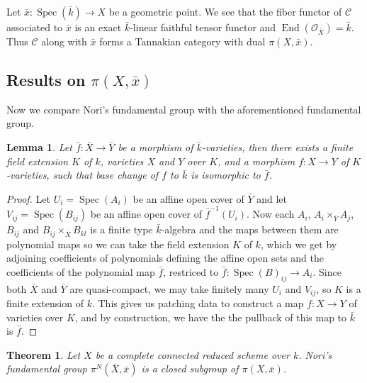 \documentclass{article}
\newcommand{\spec}[1]{\operatorname{Spec}(#1)}
\newcommand{\cat}{\mathcal C} %
\newtheorem{theorem}{Theorem}
\newtheorem{lemma}{Lemma}
\begin{document}
Let $\bar x: \spec {\bar k} \rightarrow X$ be a geometric point. We see that the fiber functor of $\cat$ associated to 
$\bar x$ is an exact $\bar k$-linear faithful tensor functor and $\operatorname{End}(\mathcal O_{\bar X}) = \bar k$. 
Thus $\cat$ along with $\bar x$ forms a Tannakian category with dual $\pi(X,\bar x)$. 

\subsection{Results on $\pi(X,\bar x)$}

Now we compare Nori's fundamental group with the aforementioned fundamental group.
\begin{lemma}
  Let $\bar f:\bar X\rightarrow \bar Y$ be a morphism of $\bar k$-varieties, then there exists a 
  finite field extension $K$ of $k$, varieties $X$ and $Y$ over $K$, and a morphism $f:X \rightarrow Y$ of 
  $K$-varieties, such that base change of $f$ to $\bar k$ is isomorphic to $\bar f$.
\end{lemma}
\begin{proof}
  Let $U_i = \spec {A_i}$ be an affine open cover of $\bar Y$ and let $V_{ij} = \spec {B_{ij}}$ be an affine open cover
  of $\bar f ^{-1} (U_i)$. Now each $A_i$, $A_i \times _{\bar Y} A_j$, $B_{ij}$ and $B_{ij} \times _{\bar X} B_{kl}$ 
  is a finite type $\bar k$-algebra and the maps between them are polynomial maps so we can take the field extension 
  $K$ of $k$, which we get by adjoining coefficients of polynomials defining the affine open sets and the coefficients
  of the polynomial map $\bar f$, restriced to $\bar f : \spec B_{ij} \rightarrow {A_i}$. Since both $\bar X$ and 
  $\bar Y$ are quasi-compact, we may take finitely many $U_i$ and $V_{ij}$, so $K$ is a finite extension of $k$. This
  gives us patching data to construct a map $f:X \rightarrow Y$ of varieties over $K$, and by construction, we have 
  the the pullback of this map to $\bar k$ is $\bar f$. 
\end{proof}
\begin{theorem}
  Let $X$ be a complete connected reduced scheme over $k$. Nori's fundamental group $\pi^N(\bar X, \bar x)$ is a
  closed subgroup of $\pi(X,\bar x)$.
\end{theorem}
\end{document}
